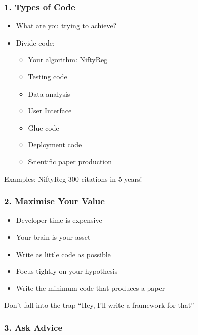 \subsubsection{1. Types of Code}\label{types-of-code}

\begin{itemize}
\itemsep1pt\parskip0pt
\item
  What are you trying to achieve?
\item
  Divide code:

  \begin{itemize}
  \itemsep1pt\parskip0pt
  \item
    Your algorithm:
    \href{http://cmictig.cs.ucl.ac.uk/wiki/index.php/NiftyReg}{NiftyReg}
  \item
    Testing code
  \item
    Data analysis
  \item
    User Interface
  \item
    Glue code
  \item
    Deployment code
  \item
    Scientific
    \href{http://www.sciencedirect.com/science/article/pii/S0169260709002533}{paper}
    production
  \end{itemize}
\end{itemize}

Examples: NiftyReg 300 citations in 5 years!

\subsubsection{2. Maximise Your Value}\label{maximise-your-value}

\begin{itemize}
\itemsep1pt\parskip0pt
\item
  Developer time is expensive
\item
  Your brain is your asset
\item
  Write as little code as possible
\item
  Focus tightly on your hypothesis
\item
  Write the minimum code that produces a paper
\end{itemize}

Don't fall into the trap ``Hey, I'll write a framework for that''

\subsubsection{3. Ask Advice}\label{ask-advice}

